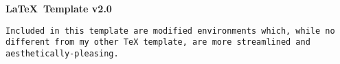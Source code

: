 \documentclass{article}
\theoremstyle{definition}
\theoremstyle{definition}
\theoremstyle{definition}
\theoremstyle{definition}
\theoremstyle{definition}
\begin{document}
\centerline{\huge{\bf{\LaTeX  \ Template v2.0}}}
\vspace{0.2in}
\texttt{Included in this template are modified environments which, while no different from my other TeX template, are more streamlined and aesthetically-pleasing.}
\end{document}
